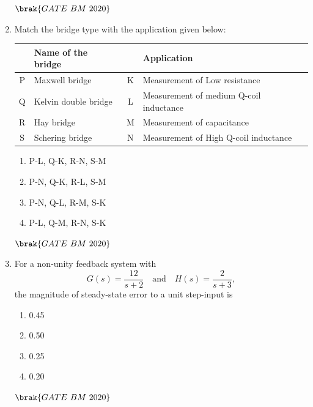 \documentclass[journal,12pt,onecolumn]{IEEEtran}
\theoremstyle{remark}
\begin{document}
\begin{enumerate}
 \hfill $\brak{GATE\ BM\ 2020}$\\

\item Match the bridge type with the application given below:\\
\begin{center}
\begin{tabular}{|c|l|c|l|}
\hline
\textbf{} & \textbf{Name of the bridge} & \textbf{} & \textbf{Application} \\
\hline
P & Maxwell bridge & K & Measurement of Low resistance \\
\hline
Q & Kelvin double bridge & L & Measurement of medium Q-coil inductance \\
\hline
R & Hay bridge & M & Measurement of capacitance \\
\hline
S & Schering bridge & N & Measurement of High Q-coil inductance \\
\hline
\end{tabular}
\end{center}

\begin{enumerate}[label=\alph*)] 
\item\hspace{0.5cm}P-L, Q-K, R-N, S-M
\item\hspace{0.5cm}P-N, Q-K, R-L, S-M
\item\hspace{0.5cm}P-N, Q-L, R-M, S-K
\item\hspace{0.5cm}P-L, Q-M, R-N, S-K
\end{enumerate}
\hfill $\brak{GATE\ BM\ 2020}$\\

\item For a non-unity feedback system with  
\[
G(s) = \frac{12}{s + 2}
\quad \text{and} \quad
H(s) = \frac{2}{s + 3},
\]
the magnitude of steady-state error to a unit step-input is 

\begin{enumerate}[label=\alph*)] 
\item\hspace{0.5cm}0.45
\item\hspace{0.5cm}0.50
\item\hspace{0.5cm}0.25
\item\hspace{0.5cm}0.20
\end{enumerate}
\hfill $\brak{GATE\ BM\ 2020}$\\


\end{enumerate}
\end{document}
